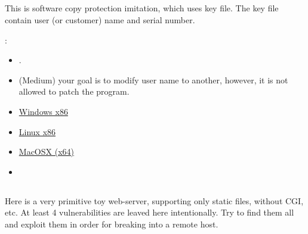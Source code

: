 \subsection{}

{This is software copy protection imitation, which uses key file}.
{The key file contain user (or customer) name and serial number}.

:

\begin{itemize}
\item
{}.

\item
{}
{(Medium) your goal is to modify user name to another, however, it is not allowed to patch the program}.
\end{itemize}

\begin{itemize}
\item
\href{http://yurichev.com/RE-exercises/3/5/super_mega_protection.exe}{Windows x86}

\item
\href{http://yurichev.com/RE-exercises/3/5/super_mega_protection.tar}{Linux x86}

\item
\href{http://yurichev.com/RE-exercises/3/5/super_mega_protection_MacOSX.tar}{MacOSX (x64)}

\item
\href{http://yurichev.com/RE-exercises/3/5/sample.key}{}
\end{itemize}

\subsection{}

{Here is a very primitive toy web-server, supporting only static files, without \ac{CGI}, etc}.
{At least 4 vulnerabilities are leaved here intentionally}.
{Try to find them all and exploit them in order for breaking into a remote host}.

